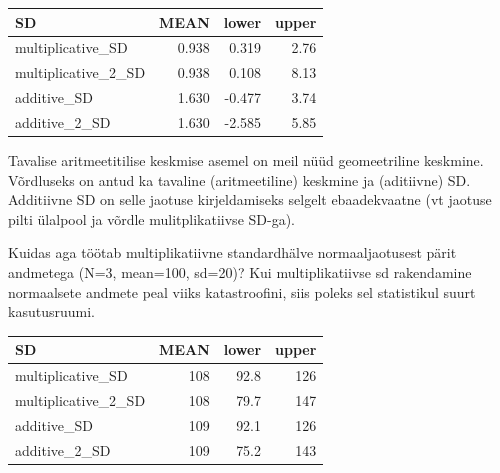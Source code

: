 \documentclass[]{book}
\newenvironment{Shaded}{\begin{snugshade}}{\end{snugshade}}
\newcommand{\KeywordTok}[1]{\textcolor[rgb]{0.13,0.29,0.53}{\textbf{#1}}}
\newcommand{\DataTypeTok}[1]{\textcolor[rgb]{0.13,0.29,0.53}{#1}}
\newcommand{\DecValTok}[1]{\textcolor[rgb]{0.00,0.00,0.81}{#1}}
\newcommand{\StringTok}[1]{\textcolor[rgb]{0.31,0.60,0.02}{#1}}
\newcommand{\CommentTok}[1]{\textcolor[rgb]{0.56,0.35,0.01}{\textit{#1}}}
\newcommand{\OperatorTok}[1]{\textcolor[rgb]{0.81,0.36,0.00}{\textbf{#1}}}
\newcommand{\NormalTok}[1]{#1}
\begin{document}
\begin{Shaded}
\end{Shaded}

\begin{tabular}{l|r|r|r}
\hline
SD & MEAN & lower & upper\\
\hline
multiplicative\_SD & 0.938 & 0.319 & 2.76\\
\hline
multiplicative\_2\_SD & 0.938 & 0.108 & 8.13\\
\hline
additive\_SD & 1.630 & -0.477 & 3.74\\
\hline
additive\_2\_SD & 1.630 & -2.585 & 5.85\\
\hline
\end{tabular}

Tavalise aritmeetitilise keskmise asemel on meil nüüd geomeetriline
keskmine. Võrdluseks on antud ka tavaline (aritmeetiline) keskmine ja
(aditiivne) SD. Additiivne SD on selle jaotuse kirjeldamiseks selgelt
ebaadekvaatne (vt jaotuse pilti ülalpool ja võrdle mulitplikatiivse
SD-ga).

Kuidas aga töötab multiplikatiivne standardhälve normaaljaotusest pärit
andmetega (N=3, mean=100, sd=20)? Kui multiplikatiivse sd rakendamine
normaalsete andmete peal viiks katastroofini, siis poleks sel
statistikul suurt kasutusruumi.

\begin{tabular}{l|r|r|r}
\hline
SD & MEAN & lower & upper\\
\hline
multiplicative\_SD & 108 & 92.8 & 126\\
\hline
multiplicative\_2\_SD & 108 & 79.7 & 147\\
\hline
additive\_SD & 109 & 92.1 & 126\\
\hline
additive\_2\_SD & 109 & 75.2 & 143\\
\hline
\end{tabular}
\end{document}
